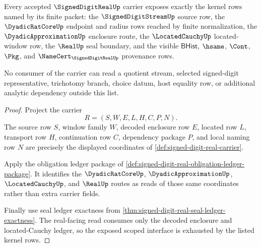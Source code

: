 \begin{theorem}
\label{thm:signed-digit-real-scoped-kernel-interface}
Every accepted $\SignedDigitRealUp$ carrier exposes exactly the kernel rows named by its finite packet: the $\SignedDigitStreamUp$ source row, the $\DyadicRatCoreUp$ endpoint and radius rows reached by finite normalization, the $\DyadicApproximationUp$ enclosure route, the $\LocatedCauchyUp$ located-window row, the $\RealUp$ seal boundary, and the visible $\mathsf{BHist}$, $\hsame$, $\Cont$, $\Pkg$, and $\NameCert_{\SignedDigitRealUp}$ provenance rows.

No consumer of the carrier can read a quotient stream, selected signed-digit representative, trichotomy branch, choice datum, host equality row, or additional analytic dependency outside this list.
\end{theorem}
\begin{proof}
Project the carrier
$$
R=(S,W,E,L,H,C,P,N).
$$
The source row $S$, window family $W$, decoded enclosure row $E$, located row $L$, transport row $H$, continuation row $C$, dependency package $P$, and local naming row $N$ are precisely the displayed coordinates of \autoref{def:signed-digit-real-carrier}.

Apply the obligation ledger package of \autoref{def:signed-digit-real-obligation-ledger-package}. It identifies the $\DyadicRatCoreUp$, $\DyadicApproximationUp$, $\LocatedCauchyUp$, and $\RealUp$ routes as reads of those same coordinates rather than extra carrier fields.

Finally use seal ledger exactness from \autoref{thm:signed-digit-real-seal-ledger-exactness}. The real-facing read consumes only the decoded enclosure and located-Cauchy ledger, so the exposed scoped interface is exhausted by the listed kernel rows.
\end{proof}

